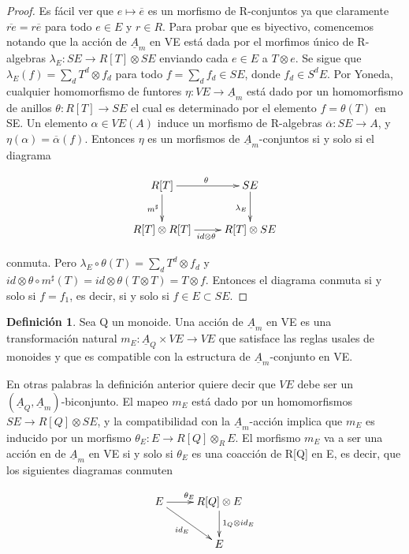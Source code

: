 \documentclass[12pt,spanish]{amsart}
\theoremstyle{definition}
\newtheorem{Def}[Theorem]{Definición}
\theoremstyle{remark}
\begin{document}
\begin{proof}
Es fácil ver que $e \mapsto \overline{e}$ es un morfismo de R-conjuntos ya que claramente $\overline{re}=r\overline{e}$ para todo $e\in E$ y $r\in R$. Para probar que es biyectivo, comencemos notando que la acción de $\underline{A}_{m}$ en VE está dada por el morfimos único de R-algebras $\lambda_{E}:SE \to R[T]\otimes SE$ enviando cada $e\in E$ a $T \otimes e$. Se sigue que $\lambda_{E}(f)=\sum_{d} T^{d} \otimes f_{d}$ para todo $f=\sum_{d} f_{d} \in SE$, donde $f_{d}\in S^{d}E$. Por Yoneda, cualquier homomorfismo de funtores $\eta: VE \to \underline{A}_{m}$ está dado por un homomorfismo de anillos $\theta:R[T] \to SE$ el cual es determinado por el elemento $f=\theta(T)$ en SE. Un elemento $\alpha\in VE(A)$ induce un morfismo de R-algebras $\overline{\alpha}:SE \to A$, y $\eta(\alpha)=\overline{\alpha}(f)$. Entonces $\eta$ es un morfismos de $\underline{A}_{m}$-conjuntos si y solo si el diagrama


$$\xymatrix{
R[T] \ar[d]_{m^{\sharp}} \ar[r]^{\theta} & SE \ar[d]_{\lambda_{E}} \\
R[T] \otimes R[T] \ar[r]_{id\otimes \theta} & R[T] \otimes SE
}
$$

conmuta. Pero $\lambda_{E} \circ \theta(T)= \sum_{d} T^{d}\otimes f_{d}$ y $id\otimes \theta \circ m^{\sharp}(T) = id\otimes \theta(T\otimes T)=T\otimes f$. Entonces el diagrama conmuta si y solo si $f=f_{1}$, es decir, si y solo si $f\in E \subset SE$.  
\end{proof}

\begin{Def}
Sea Q un monoide. Una acción de $\underline{A}_{m}$ en VE es una transformación natural $m_{E}:\underline{A}_{Q}\times VE \to VE$ que satisface las reglas usales de monoides y que es compatible con la estructura de $\underline{A}_{m}$-conjunto en VE.
\end{Def}

En otras palabras la definición anterior quiere decir que $VE$ debe ser un $(\underline{A}_{Q},\underline{A}_{m})$-biconjunto. El mapeo $m_{E}$ está dado por un homomorfismos $SE \to R[Q]\otimes SE$, y la compatibilidad con la $\underline{A}_{m}$-acción implica que $m_{E}$ es inducido por un morfismo $\theta_{E}:E \to R[Q]\otimes _{R} E$. El morfismo $m_{E}$ va a ser una acción en de $\underline{A}_{m}$ en VE si y solo si $\theta_{E}$ es una coacción de R[Q] en E, es decir, que los siguientes diagramas conmuten

$$\xymatrix{
E \ar[dr]_{id_{E}} \ar[r]^{\theta_{E}} & R[Q] \otimes E \ar[d]^{1_{Q}\otimes id_{E}} \\
& E
}
$$
\end{document}
